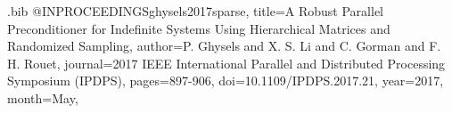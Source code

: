 \documentclass{article}
\begin{document}
\begin{filecontents}{\jobname.bib}
@INPROCEEDINGS{ghysels2017sparse,
  title={A Robust Parallel Preconditioner for Indefinite Systems Using Hierarchical Matrices and Randomized Sampling},
  author={P. Ghysels and X. S. Li and C. Gorman and F. H. Rouet},
  journal={2017 IEEE International Parallel and Distributed Processing Symposium (IPDPS)},
  pages={897-906},
  doi={10.1109/IPDPS.2017.21},
  year={2017},
  month={May},
}

\end{filecontents}
\end{document}
